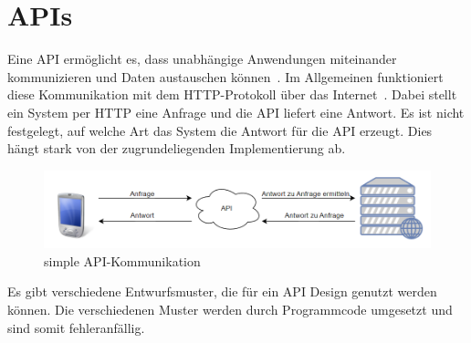 \section{APIs}
\label{api}

Eine API ermöglicht es, dass unabhängige Anwendungen miteinander kommunizieren und Daten austauschen können~\cite{api}.
Im Allgemeinen funktioniert diese Kommunikation mit dem HTTP-Protokoll über das Internet~\cite[vgl.]{awsrestgraphql}.
Dabei stellt ein System per HTTP eine Anfrage und die API liefert eine Antwort.
Es ist nicht festgelegt, auf welche Art das System die Antwort für die API erzeugt.
Dies hängt stark von der zugrundeliegenden Implementierung ab.

\begin{figure}[h!]
    \centering
    \includegraphics[width=\textwidth,height=\textheight,keepaspectratio]{img/webapi}
    \caption{simple API-Kommunikation}
    \label{basicapi}
\end{figure}

Es gibt verschiedene Entwurfsmuster, die für ein API Design genutzt werden können.
Die verschiedenen Muster werden durch Programmcode umgesetzt und sind somit fehleranfällig.

\newpage